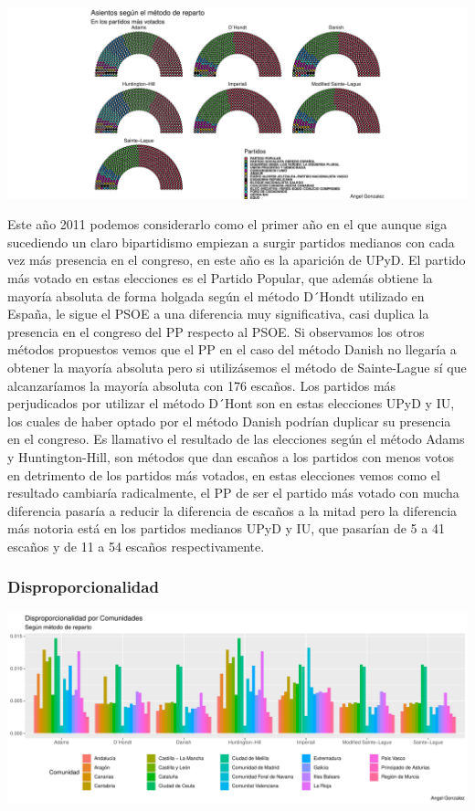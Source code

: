 \documentclass[12pt,a4paper,]{book}
\numberwithin{dummy}{section}
\theoremstyle{ocrenumbox}
\theoremstyle{blacknumex}
\theoremstyle{blacknumbox}
\theoremstyle{ocrenum}
\theoremstyle{ocrenum}
\begin{document}
\begin{center}\includegraphics[width=0.95\linewidth]{figurasR/unnamed-chunk-149-3} \end{center}

Este año 2011 podemos considerarlo como el primer año en el que aunque
siga sucediendo un claro bipartidismo empiezan a surgir partidos
medianos con cada vez más presencia en el congreso, en este año es la
aparición de UPyD. El partido más votado en estas elecciones es el
Partido Popular, que además obtiene la mayoría absoluta de forma holgada
según el método D´Hondt utilizado en España, le sigue el PSOE a una
diferencia muy significativa, casi duplica la presencia en el congreso
del PP respecto al PSOE. Si observamos los otros métodos propuestos
vemos que el PP en el caso del método Danish no llegaría a obtener la
mayoría absoluta pero si utilizásemos el método de Sainte-Lague sí que
alcanzaríamos la mayoría absoluta con 176 escaños. Los partidos más
perjudicados por utilizar el método D´Hont son en estas elecciones UPyD
y IU, los cuales de haber optado por el método Danish podrían duplicar
su presencia en el congreso. Es llamativo el resultado de las elecciones
según el método Adams y Huntington-Hill, son métodos que dan escaños a
los partidos con menos votos en detrimento de los partidos más votados,
en estas elecciones vemos como el resultado cambiaría radicalmente, el
PP de ser el partido más votado con mucha diferencia pasaría a reducir
la diferencia de escaños a la mitad pero la diferencia más notoria está
en los partidos medianos UPyD y IU, que pasarían de 5 a 41 escaños y de
11 a 54 escaños respectivamente.

\hypertarget{disproporcionalidad-10}{%
\subsubsection{Disproporcionalidad}\label{disproporcionalidad-10}}

\begin{center}\includegraphics[width=0.95\linewidth]{figurasR/unnamed-chunk-150-1} \end{center}
\end{document}
